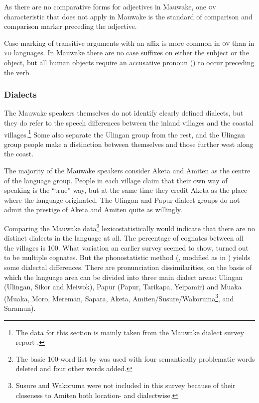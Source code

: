 As there are no comparative forms for adjectives in Mauwake, one \textsc{ov} characteristic that does not apply in Mauwake is the standard of comparison and comparison marker preceding the adjective. 

Case marking of transitive arguments with an affix is more common in \textsc{ov} than in \textsc{vo} languages.  In Mauwake there are no case suffixes on either the subject or the object, but all human objects require an accusative pronoun () to occur preceding the verb.

\subsubsection{Dialects}


The Mauwake speakers themselves do not identify clearly defined dialects, but they do refer to the speech differences between the inland villages and the coastal villages.\footnote{The data for this section is mainly taken from the Mauwake dialect survey report \citep{Jarvinen1988ms}.} Some also separate the Ulingan group from the rest, and the Ulingan group people make a distinction between themselves and those further west along the coast.

The majority of the Mauwake speakers consider Aketa and Amiten as the centre of the language group. People in each village claim that their own way of speaking is the ``true'' way, but at the same time they credit Aketa as the place where the language originated.  The Ulingan and Papur dialect groups do not admit the prestige of Aketa and Amiten quite as willingly.

Comparing the Mauwake data\footnote{The basic 100-word list by \citet[55--59]{Ezard1978} was used with four semantically problematic words deleted and four other words added.} lexicostatistically would indicate that there are no distinct dialects in the language at all. The percentage of cognates between all the villages is 100.  What variation an earlier survey seemed to show, turned out to be multiple cognates. But the phonostatistic method (\citealt{GrimesEtAl1959}, modified as in \citealt[177--178]{Simons1977}) yields some dialectal differences. There are pronunciation dissimilarities, on the basis of which the language area can be divided into three main dialect areas: Ulingan (Ulingan, Sikor and Meiwok), Papur (Papur, Tarikapa, Yeipamir) and Muaka (Muaka, Moro, Mereman, Sapara, Aketa, Amiten/Susure/Wakoruma\footnote{Susure and Wakoruma were not included in this survey because of their closeness to Amiten both location- and dialectwise.}, and Saramun). 

